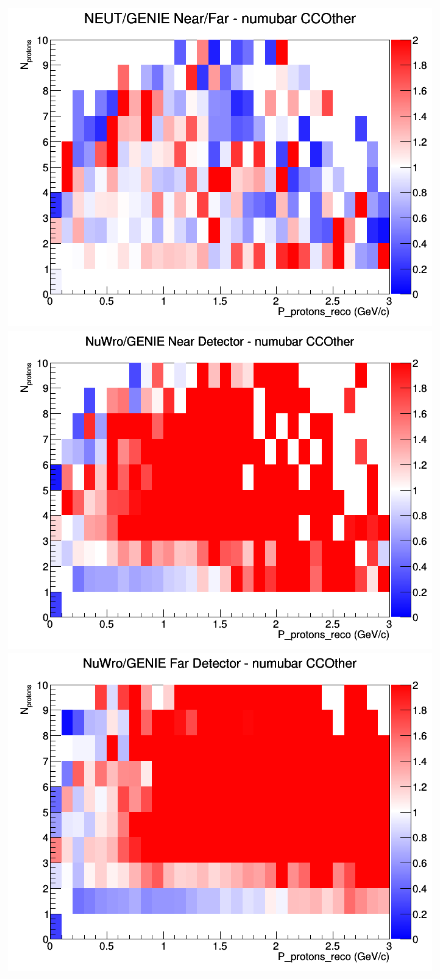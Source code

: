 \begin{figure}[h]
\endminipage
{}
\includegraphics[width=\linewidth]{eff_N_P/LAr/protons/ratios/CCOther_NEUT_GENIE_numubar_NF_N_P.png}
\endminipage
\newline
{}
\includegraphics[width=\linewidth]{eff_N_P/LAr/protons/ratios/CCOther_NuWro_GENIE_numubar_near_N_P.png}
\endminipage
{}
\includegraphics[width=\linewidth]{eff_N_P/LAr/protons/ratios/CCOther_NuWro_GENIE_numubar_far_N_P.png}

\end{figure}
